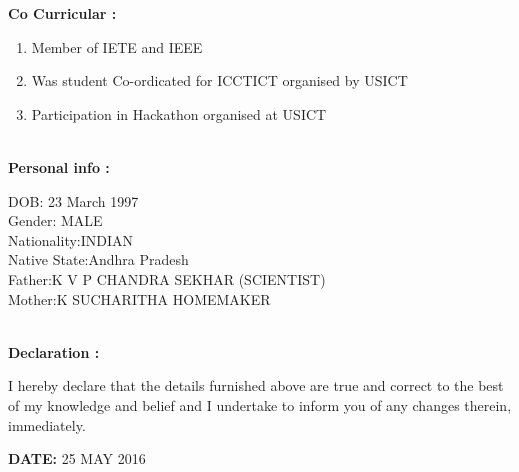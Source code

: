 \documentclass{article}
\begin{document}
\leavevmode
	\textbf{Co Curricular :}
	\begin{enumerate}
		\item Member of IETE and IEEE
		\item Was student Co-ordicated for ICCTICT organised by USICT
		\item Participation in Hackathon organised at USICT
		
		\end{enumerate}
\leavevmode
\\
\textbf{Personal info :}
		\begin{center}
			DOB: 23 March 1997\\
			Gender: MALE\\
			Nationality:INDIAN\\
			Native State:Andhra Pradesh\\
		    Father:K V P  CHANDRA SEKHAR (SCIENTIST)\\
	     	Mother:K SUCHARITHA   HOMEMAKER\\
		
		\end{center}
\leavevmode
\\
\leavevmode
\textbf{Declaration :}
	\begin{flushleft}
		I hereby declare that the details furnished above are true and correct to the best of my knowledge
		and belief and I undertake to inform you of any changes therein, immediately.
	\end{flushleft}	 

\begin{flushright}
	\textbf{DATE:} 25 MAY 2016
\end{flushright}
\end{document}
